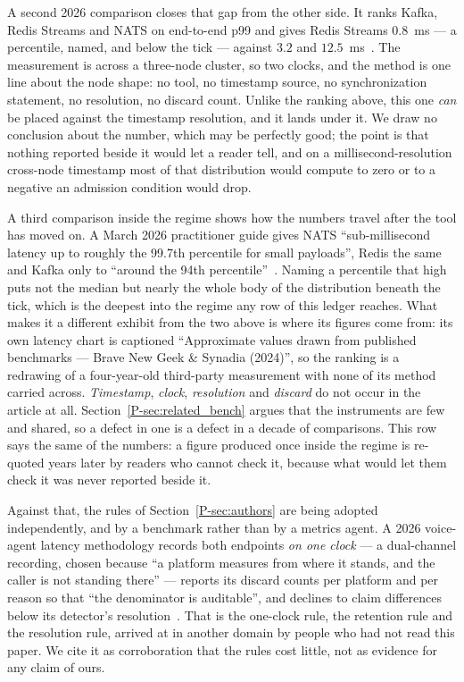 \documentclass[10pt,journal,onecolumn]{IEEEtran}
\newcommand{\kafka}{Kafka}
\newcommand{\redis}{Redis}
\newcommand{\mainRelatedBench}{\ref{P-sec:related_bench}}   %
\newcommand{\mainAuthors}{\ref{P-sec:authors}}        %
\begin{document}
A second 2026 comparison closes that gap from the other side. It ranks \kafka{}, \redis{}
Streams and NATS on end-to-end p99 and gives \redis{} Streams $0.8$~ms --- a percentile,
named, and below the tick --- against $3.2$ and $12.5$~ms~\cite{devto2026streaming}. The
measurement is across a three-node cluster, so two clocks, and the method is one line about
the node shape: no tool, no timestamp source, no synchronization statement, no resolution, no
discard count. Unlike the ranking above, this one \emph{can} be placed against the timestamp resolution,
and it lands under it. We draw no conclusion about the number, which may be perfectly good;
the point is that nothing reported beside it would let a reader tell, and on a
millisecond-resolution cross-node timestamp most of that distribution would compute to zero or to
a negative an admission condition would drop.

A third comparison inside the regime shows how the numbers travel after the tool has moved
on. A March 2026 practitioner guide gives NATS ``sub-millisecond latency up to roughly the
99.7th percentile for small payloads'', \redis{} the same and \kafka{} only to ``around the
94th percentile''~\cite{javacodegeeks2026brokers}. Naming a percentile that high puts not the
median but nearly the whole body of the distribution beneath the tick, which is the deepest
into the regime any row of this ledger reaches. What makes it a different exhibit from the two
above is where its figures come from: its own latency chart is captioned ``Approximate values
drawn from published benchmarks --- Brave New Geek \& Synadia (2024)'', so the ranking is a
redrawing of a four-year-old third-party measurement with none of its method carried across.
\emph{Timestamp}, \emph{clock}, \emph{resolution} and \emph{discard} do not occur in the
article at all. Section~\mainRelatedBench{} argues that the instruments are few and shared, so
a defect in one is a defect in a decade of comparisons. This row says the same of the numbers:
a figure produced once inside the regime is re-quoted years later by readers who cannot check
it, because what would let them check it was never reported beside it.

Against that, the rules of Section~\mainAuthors{} are being adopted independently, and by a
benchmark rather than by a metrics agent. A 2026 voice-agent latency methodology records both
endpoints \emph{on one clock} --- a dual-channel recording, chosen because ``a platform
measures from where it stands, and the caller is not standing there'' --- reports its
discard counts per platform and per reason so that ``the denominator is auditable'', and
declines to claim differences below its detector's resolution~\cite{openbenchmarks2026voice}.
That is the one-clock rule, the retention rule and the resolution rule, arrived at in another
domain by people who had not read this paper. We cite it as corroboration that the rules cost
little, not as evidence for any claim of ours.
\end{document}
